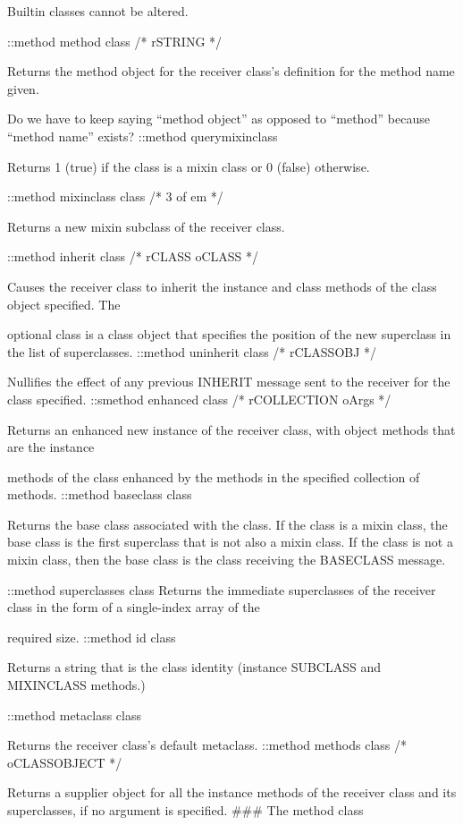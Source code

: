 Builtin classes cannot be altered.

::method method class /* rSTRING */

Returns the method object for the receiver class's definition for the
method name given.

Do we have to keep saying ``method object'' as opposed to ``method''
because ``method name'' exists? ::method querymixinclass

Returns 1 (true) if the class is a mixin class or 0 (false) otherwise.

::method mixinclass class /* 3 of em */

Returns a new mixin subclass of the receiver class.

::method inherit class /* rCLASS oCLASS */

Causes the receiver class to inherit the instance and class methods of
the class object specified. The

optional class is a class object that specifies the position of the new
superclass in the list of superclasses. ::method uninherit class /*
rCLASSOBJ */

Nullifies the effect of any previous INHERIT message sent to the
receiver for the class specified. ::smethod enhanced class /*
rCOLLECTION oArgs */

Returns an enhanced new instance of the receiver class, with object
methods that are the instance

methods of the class enhanced by the methods in the specified collection
of methods. ::method baseclass class

Returns the base class associated with the class. If the class is a
mixin class, the base class is the first superclass that is not also a
mixin class. If the class is not a mixin class, then the base class is
the class receiving the BASECLASS message.

::method superclasses class Returns the immediate superclasses of the
receiver class in the form of a single-index array of the

required size. ::method id class

Returns a string that is the class identity (instance SUBCLASS and
MIXINCLASS methods.)

::method metaclass class

Returns the receiver class's default metaclass. ::method methods class
/* oCLASSOBJECT */

Returns a supplier object for all the instance methods of the receiver
class and its superclasses, if no argument is specified. \#\#\# The
method class

